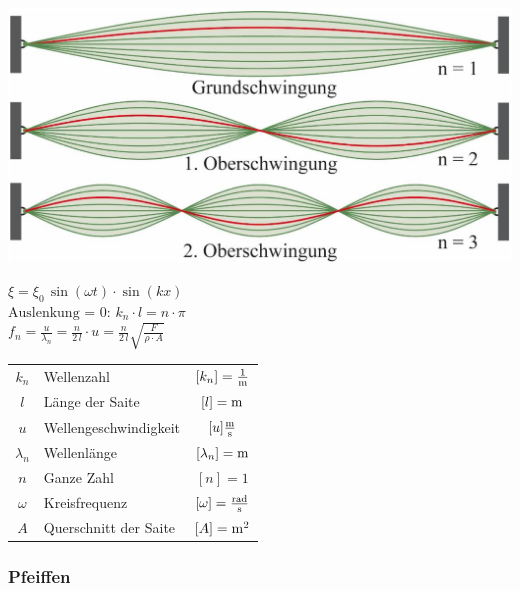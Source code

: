 \begin{minipage}{0.48\linewidth}
\includegraphics[width=0.98\linewidth]{Bilder/Wellen-Optik/saite} \\
\end{minipage}
\hfill
\begin{minipage}{0.48\linewidth}
$ \boxed{ \xi = \xi_0 \, \sin(\omega t) \cdot \sin(k x)  } $ \\

$ \boxed{ \text{Auslenkung = 0: } k_n \cdot l = n \cdot \pi } $ \\

$ \boxed{ f_n = \frac{u}{\lambda_n} = \frac{n}{2 \, l} \cdot u =  \frac{n}{2 \, l} \sqrt{\frac{F}{\rho \cdot A}} } $ \\
\end{minipage}

\vspace{0.2cm}

\renewcommand{\arraystretch}{1.1}
\begin{tabular}{clc}
$k_n$ & Wellenzahl & $[k_n] = \frac{1}{\mathrm{m}} $ \\
$l$ & Länge der Saite & $[l] = \mathrm{m}$ \\
$u$ & Wellengeschwindigkeit & $[u] \frac{\mathrm{m}}{\mathrm{s}}$ \\
$\lambda_n$ & Wellenlänge & $[\lambda_n]= \mathrm{m}$ \\
$n$ & Ganze Zahl & $[n] = 1$ \\
$\omega$ & Kreisfrequenz & $[\omega] = \frac{\mathrm{rad}}{\mathrm{s}}$ \\
$A$ & Querschnitt der Saite & $[A] = \mathrm{m}^2$
\end{tabular}



\subsubsection{Pfeiffen}

